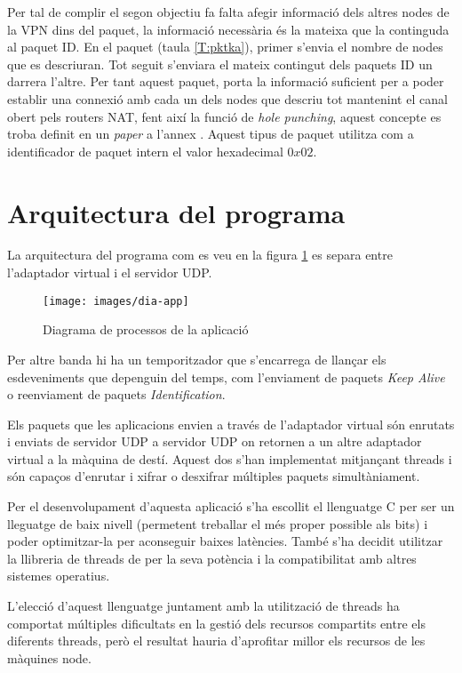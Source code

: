 Per tal de complir el segon objectiu fa falta afegir informació dels altres nodes de la VPN dins del paquet, la informació necessària és la mateixa que la continguda al paquet ID.
En el paquet (taula \ref{T:pktka}), primer s'envia el nombre de nodes que es descriuran. Tot seguit s'enviara el mateix contingut dels paquets ID un darrera l'altre.
Per tant aquest paquet, porta la informació suficient per a poder establir una connexió amb cada un dels nodes que descriu tot mantenint el canal obert pels routers NAT, fent així la funció de \emph{hole punching}, aquest concepte es troba definit en un \emph{paper} a l'annex .
Aquest tipus de paquet utilitza com a identificador de paquet intern el valor hexadecimal $0x02$.

\section{Arquitectura del programa}
La arquitectura del programa com es veu en la figura \ref{F:dia-app} es separa entre l'adaptador virtual i el servidor UDP.
\begin{figure}[htb]
\centering
\texttt{[image: images/dia-app]}
\caption{Diagrama de processos de la aplicació}
\label{F:dia-app}
\end{figure}
\label{arch-temp}
Per altre banda hi ha un temporitzador que s'encarrega de llançar els esdeveniments que depenguin del temps, com l'enviament de paquets \emph{Keep Alive} o reenviament de paquets \emph{Identification}.

Els paquets que les aplicacions envien a través de l'adaptador virtual són enrutats i enviats de servidor UDP a servidor UDP on retornen a un altre adaptador virtual a la màquina de destí. Aquest dos s'han implementat mitjançant threads i són capaços d'enrutar i xifrar o desxifrar múltiples paquets simultàniament.

Per el desenvolupament d'aquesta aplicació s'ha escollit el llenguatge C per ser un lleguatge de baix nivell (permetent treballar el més proper possible als bits) i poder optimitzar-la per aconseguir baixes latències. També s'ha decidit utilitzar la llibreria de threads de  per la seva potència i la compatibilitat amb altres sistemes operatius.

L'elecció d'aquest llenguatge juntament amb la utilització de threads ha comportat múltiples dificultats en la gestió dels recursos compartits entre els diferents threads, però el resultat hauria d'aprofitar millor els recursos de les màquines node.

